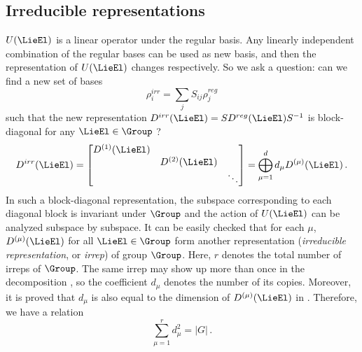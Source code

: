 
\subsection{Irreducible representations}

$U(\LieEl)$ is a linear operator under the regular basis.
Any linearly independent combination of the regular bases can be used as
new basis, and then the representation of $U(\LieEl)$ changes respectively.
So we ask a question: can we find a new set of bases
\begin{equation}
  \rho^{irr}_i=\sum_j S_{ij}\rho^{reg}_j
  \label{eq:trans}
\end{equation}
such that the new representation $D^{irr}(\LieEl) = SD^{reg}(\LieEl)S^{-1}$ is block-diagonal
for any $\LieEl\in\Group$ ?
\begin{equation}
  D^{irr}(\LieEl) =
  \begin{bmatrix}
    D^{(1)}(\LieEl) & & \\
    & D^{(2)}(\LieEl) & \\
    & & \ddots \\
  \end{bmatrix}
  = \bigoplus_{\mu=1}^\shift d_\mu D^{(\mu)}(\LieEl)
  \,.
  \label{eq:irre}
\end{equation}
In such a block-diagonal representation, the
subspace corresponding to each diagonal block is invariant under $\Group$
and the action of $U(\LieEl)$ can be analyzed subspace by subspace.
It can be easily checked that for each $\mu$, $D^{(\mu)}(\LieEl)$ for all
$\LieEl\in\Group$ form another representation (\emph{irreducible
  representation}, or \emph{irrep}) of group $\Group$.
Here, $r$ denotes the total number of
irreps of $\Group$. The same irrep may show up more than once in the decomposition
, so the coefficient $d_{\mu}$ denotes the number of its
copies.  Moreover, it is proved that $d_{\mu}$ is also equal to the dimension
of $D^{(\mu)}(\LieEl)$ in .
Therefore, we have a relation
\[
  \sum_{\mu=1}^r d_\mu^2 = |G|
  \,.
\]


